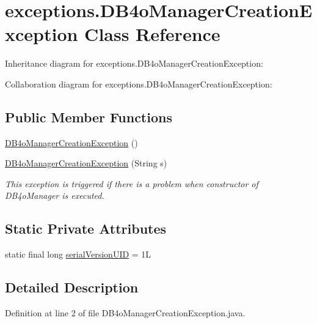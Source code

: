 \hypertarget{classexceptions_1_1DB4oManagerCreationException}{}\section{exceptions.\+D\+B4o\+Manager\+Creation\+Exception Class Reference}
\label{classexceptions_1_1DB4oManagerCreationException}


Inheritance diagram for exceptions.\+D\+B4o\+Manager\+Creation\+Exception\+:


Collaboration diagram for exceptions.\+D\+B4o\+Manager\+Creation\+Exception\+:
\subsection*{Public Member Functions}
\begin{DoxyCompactItemize}
\item 
\mbox{\hyperlink{classexceptions_1_1DB4oManagerCreationException_a5da5879180740606e8a3f1c2f88f01dc}{D\+B4o\+Manager\+Creation\+Exception}} ()
\item 
\mbox{\hyperlink{classexceptions_1_1DB4oManagerCreationException_a45281047a13292cbee85b6f04547adc5}{D\+B4o\+Manager\+Creation\+Exception}} (String s)
\begin{DoxyCompactList}\small\item\em This exception is triggered if there is a problem when constructor of D\+B4o\+Manager is executed. \end{DoxyCompactList}\end{DoxyCompactItemize}
\subsection*{Static Private Attributes}
\begin{DoxyCompactItemize}
\item 
static final long \mbox{\hyperlink{classexceptions_1_1DB4oManagerCreationException_af611b151185c866376c172feb883428a}{serial\+Version\+U\+ID}} = 1L
\end{DoxyCompactItemize}


\subsection{Detailed Description}


Definition at line 2 of file D\+B4o\+Manager\+Creation\+Exception.\+java.



